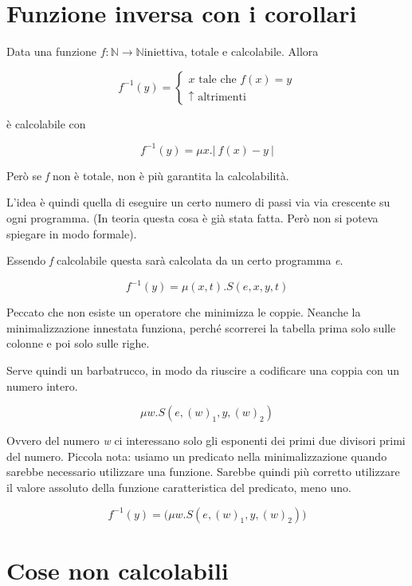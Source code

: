 
\section{Funzione inversa con i corollari}

Data una funzione $ f : \mathbb{N} \rightarrow \mathbb{N} $iniettiva, totale e calcolabile. Allora

$$ 
f^{-1}(y) =\begin{cases}
x \text{ tale che } f(x) = y \\
\uparrow \text{ altrimenti}
\end{cases}
$$

è calcolabile con

$$
f^{-1}(y) = \mu x. |\: f(x) - y\:|
$$

Però se \textit{f} non è totale, non è più garantita la calcolabilità.

L'idea è quindi quella di eseguire un certo numero di passi via via crescente su ogni programma. (In teoria questa cosa è già stata fatta. Però non si poteva spiegare in modo formale).

Essendo \textit{f} calcolabile questa sarà calcolata da un certo programma \textit{e}.

$$
f^{-1}(y) = \mu (x,t). S(e, x,y, t)
$$

Peccato che non esiste un operatore che minimizza le coppie. Neanche la minimalizzazione innestata funziona, perché scorrerei la tabella prima solo sulle colonne e poi solo sulle righe.

Serve quindi un barbatrucco, in modo da riuscire a codificare una coppia con un numero intero.

$$
\mu w.  S(e, (w)_1, y, (w)_2 )
$$

Ovvero del numero \textit{w} ci interessano solo gli esponenti dei primi due divisori primi del numero.
Piccola nota: usiamo un predicato nella minimalizzazione quando sarebbe necessario utilizzare una funzione. Sarebbe quindi più corretto utilizzare il valore assoluto della funzione caratteristica del predicato, meno uno.

$$
f^{-1}(y) = \Big( \mu w.  S(e, (w)_1, y, (w)_2 ) \Big)
$$

\section{Cose non calcolabili}

